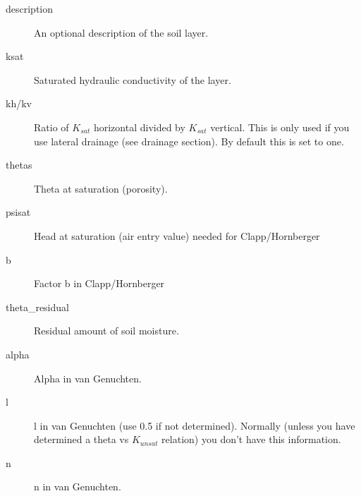 \begin{description}

\item[description]
An optional description of the soil layer.

\item[ksat]
Saturated hydraulic conductivity of the layer.

\item[kh/kv]
Ratio of $K_{sat}$ horizontal divided by $K_{sat}$ vertical. This
is only used if you use lateral drainage (see drainage section).
By default this is set to one.

\item[thetas]
Theta at saturation (porosity).

\item[psisat]
Head at saturation (air entry value) needed for Clapp/Hornberger

\item[b]
Factor b in Clapp/Hornberger

\item[theta\_residual]
Residual amount of soil moisture.

\item[alpha]
Alpha in van Genuchten.

\item[l]
l in van Genuchten (use 0.5 if not determined). Normally (unless you
have determined a theta vs $K_{unsat}$ relation) you don't
have this information.

\item[n]
n in van Genuchten.



\end{description}
